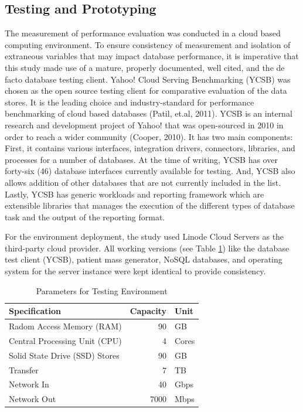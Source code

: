 \documentclass[5p]{elsarticle}
\begin{document}
\subsection{Testing and Prototyping}
The measurement of performance evaluation was conducted in a cloud based computing environment. To ensure consistency of measurement and isolation of extraneous variables that may impact database performance, it is imperative that this study made use of a mature, properly documented, well cited, and the de facto database testing client. Yahoo! Cloud Serving Benchmarking (YCSB) was chosen as the open source testing client for comparative evaluation of the data stores. It is the leading choice and industry-standard for performance benchmarking of cloud based databases (Patil, et.al, 2011).
YCSB is an internal research and development project of Yahoo! that was open-sourced in 2010 in order to reach a wider community (Cooper, 2010). It has two main components: First, it contains various interfaces, integration drivers, connectors, libraries, and processes for a number of databases. At the time of writing, YCSB has over forty-six (46) database interfaces currently available for testing. And, YCSB also allows addition of other databases that are not currently included in the list. Lastly, YCSB has generic workloads and reporting framework which are extensible libraries that manages the execution of the different types of database task and the output of the reporting format.

For the environment deployment, the study used Linode Cloud Servers as the third-party cloud provider. 
All working versions (see Table \ref{table.cloud.environment}) like the database test client (YCSB), patient mass generator, NoSQL databases, 
and operating system for the server instance were kept identical to provide consistency. 

\begin{table}[!ht]
    \centering
    \caption{Parameters for Testing Environment}
     \label{table.cloud.environment}
        \begin{tabular}{lrl}
        \toprule
        Specification &  Capacity & Unit \\
        \hline
        Radom Access Memory (RAM)  & 90 &GB \\
        Central Processing Unit (CPU)  & 4 &Cores \\
        Solid State Drive (SSD) Stores  & 90 &GB \\
        Transfer &  7 &TB \\
        Network In &  40 &Gbps \\
        Network Out &  7000 &Mbps \\
        \hline
    \end{tabular}
\end{table}
\end{document}
